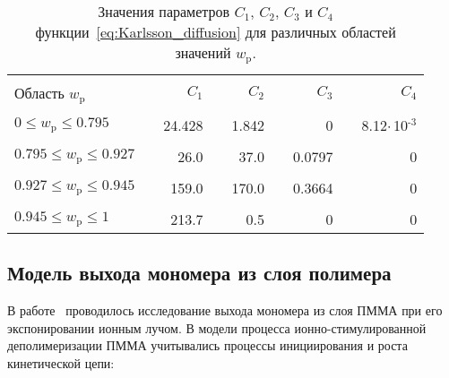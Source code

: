 \begin{table}[h]
	\begin{center}
		\caption{Значения параметров $C_1$, $C_2$, $C_3$ и $C_4$ функции~\ref{eq:Karlsson_diffusion} для различных областей значений $w_\mathrm{p}$.}
		\begin{tabular}{lc rc rc rc r}
			\hline \hline \\ [-1em]
			Область $w_\mathrm{p}$ & \hspace{1em} & $C_1$ & \hspace{1em} & $C_2$ & \hspace{1em} & $C_3$ & \hspace{1em} & $C_4$
			\\ \hline \\ [-1em]
			$0 \leq w_\mathrm{p} \leq 0.795$ & \hspace{1em} & 24.428 & \hspace{1em} & 1.842 & \hspace{1em} & 0 & \hspace{1em} & 8.12\:$\cdot$\,10$^\text{-3}$
			\\ \\ [-1em]
			$0.795 \leq w_\mathrm{p} \leq 0.927$ & \hspace{1em} & 26.0 & \hspace{1em} & 37.0 & \hspace{1em} & 0.0797 & \hspace{1em} & 0
			\\ \\ [-1em]
			$0.927 \leq w_\mathrm{p} \leq 0.945$ & \hspace{1em} & 159.0 & \hspace{1em} & 170.0 & \hspace{1em} & 0.3664 & \hspace{1em} & 0
			\\ \\ [-1em]
			$0.945 \leq w_\mathrm{p} \leq 1$ & \hspace{1em} & 213.7 & \hspace{1em} & 0.5 & \hspace{1em} & 0 & \hspace{1em} & 0
			\\ \hline \hline
		\end{tabular}
		\label{table:Karlsson_diffusion}
	\end{center}
\end{table}


\subsection{Модель выхода мономера из слоя полимера}
В работе~\cite{Fragala_3_diffusion} проводилось исследование выхода мономера из слоя \linebreak ПММА при его экспонировании ионным лучом. В модели процесса ионно-стимулированной деполимеризации ПММА учитывались процессы инициирования и роста кинетической цепи:

